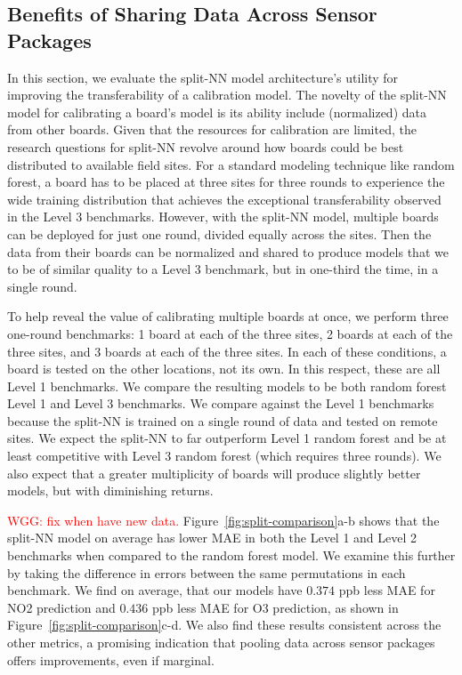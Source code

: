 \documentclass[journal abbreviation, manuscript]{copernicus}
\newcommand\todo[1]{\textcolor{red}{#1}}
\begin{document}
\subsection{Benefits of Sharing Data Across Sensor Packages}
In this section, we evaluate the split-NN model architecture's utility for improving the transferability of a calibration model.  The novelty of the split-NN model for calibrating a board's model is its ability include (normalized) data from other boards.  Given that the resources for calibration are limited, the research questions for split-NN revolve around how boards could be best distributed to available field sites.  For a standard modeling technique like random forest, a board has to be placed at three sites for three rounds to experience the wide training distribution that achieves the exceptional transferability observed in the Level 3 benchmarks.  However, with the split-NN model, multiple boards can be deployed for just one round, divided equally across the sites.  Then the data from their boards can be normalized and shared to produce models that we to be of similar quality to a Level 3 benchmark, but in one-third the time, in a single round.

To help reveal the value of calibrating multiple boards at once, we perform three one-round benchmarks: 1 board at each of the three sites, 2 boards at each of the three sites, and 3 boards at each of the three sites.  In each of these conditions, a board is tested on the other locations, not its own.  In this respect, these are all Level 1 benchmarks.  We compare the resulting models to be both random forest Level 1 and Level 3 benchmarks.  We compare against the Level 1 benchmarks because the split-NN is trained on a single round of data and tested on remote sites.  We expect the split-NN to far outperform Level 1 random forest and be at least competitive with Level 3 random forest (which requires three rounds).  We also expect that a greater multiplicity of boards will produce slightly better models, but with diminishing returns.

\todo{WGG: fix when have new data.} Figure~\ref{fig:split-comparison}a-b shows that the split-NN model on average has lower MAE in both the Level 1 and Level 2 benchmarks when compared to the random forest model. We examine this further by taking the difference in errors between the same permutations in each benchmark. We find on average, that our models have $0.374$ ppb less MAE for NO2 prediction and $0.436$ ppb less MAE for O3 prediction, as shown in Figure~\ref{fig:split-comparison}c-d.  We also find these results consistent across the other metrics, a promising indication that pooling data across sensor packages offers improvements, even if marginal.
\end{document}
